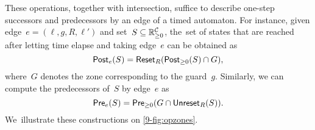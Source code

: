 These operations, together with intersection, suffice to describe
one-step successors and predecessors by an edge of a timed automaton.
For instance, given edge~$e=(\ell,g,R,\ell')$ and
set~$S \subseteq \mathbb{R}_{\geq 0}^{\mathcal{C}}$, the~set of states that are reached
after letting time elapse and taking edge~$e$ can be obtained as
\[
  \textrm{\sf Post}_e(S) = \mathsf{Reset}_R(\textrm{\sf Post}_{\geq 0}(S)\cap G),
\]
where~$G$ denotes the zone corresponding to the guard~$g$.
Similarly, we can compute the predecessors of~$S$ by edge~$e$ as
\[
\textrm{\sf Pre}_e(S) = \textrm{\sf Pre}_{\geq 0}(G \cap \textrm{\sf Unreset}_R(S)).
\]
We~illustrate these constructions on \cref{9-fig:opzones}.

